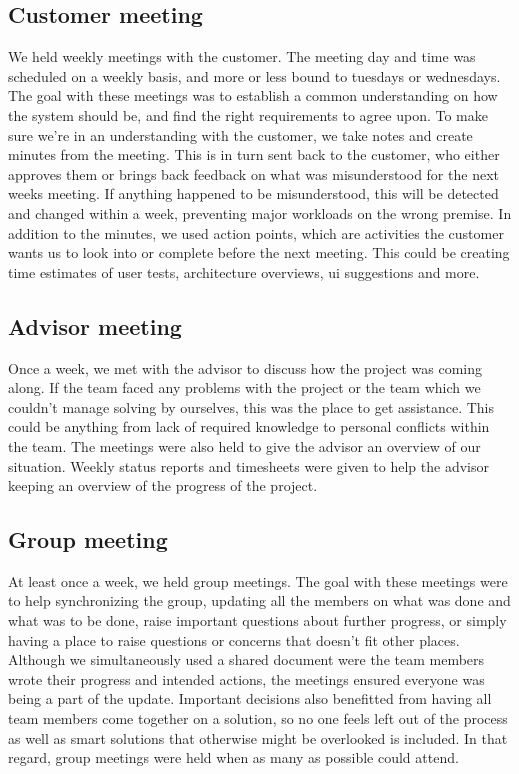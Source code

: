 \documentclass[11pt]{book}
\begin{document}
\subsection{Customer meeting}
We held weekly meetings with the customer. The meeting day and time was scheduled on a weekly basis, and more or less bound to tuesdays or wednesdays. The goal with these meetings was to establish a common understanding on how the system should be, and find the right requirements to agree upon. To make sure we’re in an understanding with the customer, we take notes and create minutes from the meeting. This is in turn sent back to the customer, who either approves them or brings back feedback on what was misunderstood for the next weeks meeting. If anything happened to be misunderstood, this will be detected and changed within a week, preventing major workloads on the wrong premise. In addition to the minutes, we used action points, which are activities the customer wants us to look into or complete before the next meeting. This could be creating time estimates of user tests, architecture overviews, ui suggestions and more.

\subsection{Advisor meeting}
Once a week, we met with the advisor to discuss how the project was coming along. If the team faced any problems with the project or the team which we couldn’t manage solving by ourselves, this was the place to get assistance. This could be anything from lack of required knowledge to personal conflicts within the team. The meetings were also held to give the advisor an overview of our situation. Weekly status reports and timesheets were given to help the advisor keeping an overview of the progress of the project.

\subsection{Group meeting}
At least once a week, we held group meetings. The goal with these meetings were to help synchronizing the group, updating all the members on what was done and what was to be done, raise important questions about further progress, or simply having a place to raise questions or concerns that doesn’t fit other places. Although we simultaneously used a shared document were the team members wrote their progress and intended actions, the meetings ensured everyone was being a part of the update. Important decisions also benefitted from having all team members come together on a solution, so no one feels left out of the process as well as smart solutions that otherwise might be overlooked is included.  In that regard, group meetings were held when as many as possible could attend.
\end{document}
